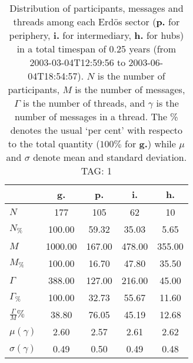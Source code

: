 \begin{table}[h!]
\begin{center}
\begin{tabular}{| l | c | c | c | c |}\hline
 & g. & p. & i. & h. \\\hline
$N$ & 177  & 105  & 62  & 10 \\\hline
$N_{\%}$ & 100.00  & 59.32  & 35.03  & 5.65 \\\hline
$M$ & 1000.00  & 167.00  & 478.00  & 355.00 \\\hline
$M_{\%}$ & 100.00  & 16.70  & 47.80  & 35.50 \\\hline
$\Gamma$ & 388.00  & 127.00  & 216.00  & 45.00 \\\hline
$\Gamma_{\%}$ & 100.00  & 32.73  & 55.67  & 11.60 \\\hline
$\frac{\Gamma}{M}\%$ & 38.80  & 76.05  & 45.19  & 12.68 \\\hline
$\mu(\gamma)$ & 2.60  & 2.57  & 2.61  & 2.62 \\\hline
$\sigma(\gamma)$ & 0.49  & 0.50  & 0.49  & 0.48 \\\hline
\end{tabular}
\caption{Distribution of participants, messages and threads among each Erd\"os sector ({\bf p.} for periphery, {\bf i.} for intermediary, 
    {\bf h.} for hubs) in a total timespan of 0.25 years (from 2003-03-04T12:59:56 to 2003-06-04T18:54:57). $N$ is the number of participants, $M$ is the number of messages, $\Gamma$ is the number of threads, and $\gamma$ is the number of messages in a thread.
    The \% denotes the usual `per cent' with respecto to the total quantity ($100\%$ for {\bf g.})
    while $\mu$ and $\sigma$ denote mean and standard deviation. TAG: 1}
\end{center}
\end{table}